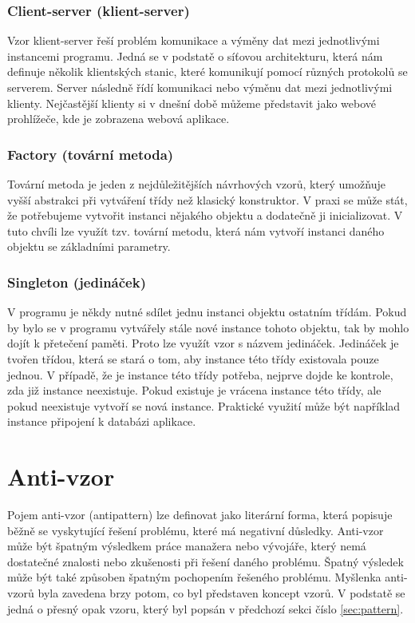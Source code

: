 \documentclass[czech,DP]{thesiskiv}
\begin{document}
\subsubsection{Client-server (klient-server)}
Vzor klient-server řeší problém komunikace a výměny dat mezi jednotlivými instancemi programu. Jedná se v podstatě o síťovou architekturu, která nám definuje několik klientských stanic, které komunikují pomocí různých protokolů se serverem. Server následně řídí komunikaci nebo výměnu dat mezi jednotlivými klienty. Nejčastější klienty si v dnešní době můžeme představit jako webové prohlížeče, kde je zobrazena webová aplikace.
\subsubsection{Factory (tovární metoda)}
Tovární metoda je jeden z nejdůležitějších návrhových vzorů, který umožňuje vyšší abstrakci při vytváření třídy než klasický konstruktor. V praxi se může stát, že potřebujeme vytvořit instanci nějakého objektu a dodatečně ji inicializovat. V tuto chvíli lze využít tzv. tovární metodu, která nám vytvoří instanci daného objektu se základními parametry.
\subsubsection{Singleton (jedináček)}
V programu je někdy nutné sdílet jednu instanci objektu ostatním třídám. Pokud by bylo se v programu vytvářely stále nové instance tohoto objektu, tak by mohlo dojít k přetečení paměti. Proto lze využít vzor s názvem jedináček. Jedináček je tvořen třídou, která se stará o tom, aby instance této třídy existovala pouze jednou. V případě, že je instance této třídy potřeba, nejprve dojde ke kontrole, zda již instance neexistuje. Pokud existuje je vrácena instance této třídy, ale pokud neexistuje vytvoří se nová instance. Praktické využití může být například instance připojení k databázi aplikace.
\section{Anti-vzor}
Pojem anti-vzor (antipattern) lze definovat jako literární forma, která popisuje běžně se vyskytující řešení problému, které má negativní důsledky. Anti-vzor může být špatným výsledkem práce manažera nebo vývojáře, který nemá dostatečné znalosti nebo zkušenosti při řešení daného problému. Špatný výsledek může být také způsoben špatným pochopením řešeného problému.\cite{antipatterns2} Myšlenka anti-vzorů byla zavedena brzy potom, co byl představen koncept vzorů.\cite{antipatterns} V podstatě se jedná o přesný opak vzoru, který byl popsán v předchozí sekci číslo \ref{sec:pattern}.
\end{document}
